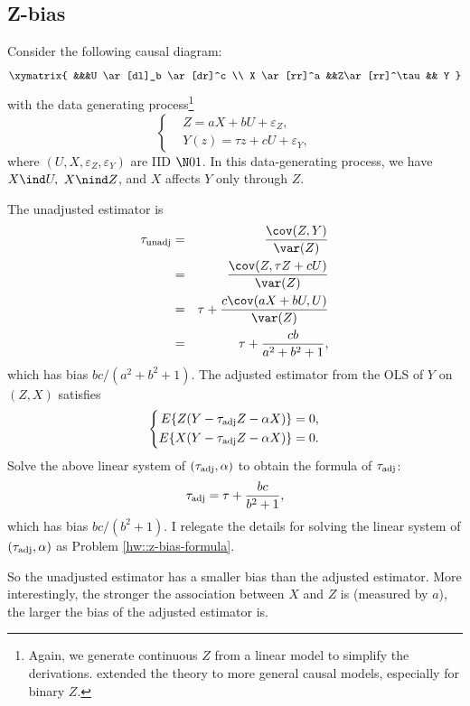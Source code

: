 \subsection{Z-bias}
\label{sec::z-bias}

 

Consider the following causal diagram:
$$
\xymatrix{
&&&U \ar[dl]_b \ar[dr]^c \\
X \ar[rr]^a &&Z\ar[rr]^\tau   && Y 
}
$$
with the data generating process\footnote{Again, we generate continuous $Z$ from a linear model to simplify the derivations.  \citet{ding2017instrumental} extended the theory to more general causal models, especially for binary $Z$. 
}
$$
\left\{ 
\begin{aligned}
&Z=   aX + bU +   \varepsilon_Z , \\
&Y(z)=   \tau z + cU +  \varepsilon_Y ,
\end{aligned}
\right. 
$$
where $(U, X, \varepsilon_Z, \varepsilon_Y) $ are IID  $ \N01$. In this data-generating process, we have
$X\ind U,$ $X\nind Z$, and $X$ affects $Y$ only through $Z$.  

 
The unadjusted estimator is
\begin{eqnarray*}
\tau_\textup{unadj} &=& \frac{ \cov(Z, Y)  }{  \var(Z) }  \\
&=& \frac{ \cov(Z, \tau Z + cU)  }{ \var(Z) }  \\
&=& \tau + \frac{c \cov(aX + bU, U)  }{  \var(Z) }  \\
&=& \tau + \frac{c b }{  a^2 + b^2 + 1} ,
\end{eqnarray*}
which has bias $bc/(a^2 + b^2 + 1)$. The adjusted estimator from the OLS of $Y$ on $(Z,X)$ satisfies
$$
\left\{ 
\begin{aligned}
E\{  Z(Y- \tau_\textup{adj} Z  - \alpha X  )  \} &= 0,\\
E\{  X(Y - \tau_\textup{adj} Z - \alpha X)  \} &= 0.
\end{aligned}
\right. 
$$
Solve the above linear system of $(\tau_\textup{adj}, \alpha)$ to obtain the formula of $  \tau_\textup{adj}$:
\begin{equation}
\label{eq::zbias-result}
  \tau_\textup{adj}  = \tau +  \frac{    bc }{   b^2+1 },
\end{equation}
which has bias $bc/(b^2+1)$. I relegate the details for solving the linear system of $(\tau_\textup{adj}, \alpha)$ as Problem \ref{hw::z-bias-formula}. 

So the unadjusted estimator has a smaller bias than the adjusted estimator. More interestingly, the stronger the association between $X$ and $Z$ is (measured by $a$), the larger the bias of the adjusted estimator is. 


